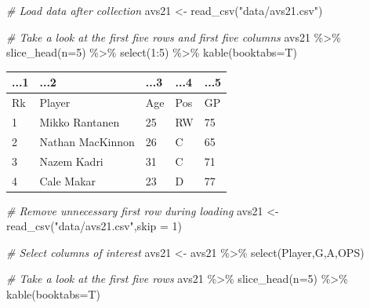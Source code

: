 \documentclass[
  11pt,
]{book}
\newenvironment{Shaded}{\begin{snugshade}}{\end{snugshade}}
\newcommand{\AttributeTok}[1]{\textcolor[rgb]{0.77,0.63,0.00}{#1}}
\newcommand{\CommentTok}[1]{\textcolor[rgb]{0.56,0.35,0.01}{\textit{#1}}}
\newcommand{\DecValTok}[1]{\textcolor[rgb]{0.00,0.00,0.81}{#1}}
\newcommand{\FunctionTok}[1]{\textcolor[rgb]{0.00,0.00,0.00}{#1}}
\newcommand{\NormalTok}[1]{#1}
\newcommand{\OtherTok}[1]{\textcolor[rgb]{0.56,0.35,0.01}{#1}}
\newcommand{\SpecialCharTok}[1]{\textcolor[rgb]{0.00,0.00,0.00}{#1}}
\newcommand{\StringTok}[1]{\textcolor[rgb]{0.31,0.60,0.02}{#1}}
\theoremstyle{definition}
\theoremstyle{definition}
\theoremstyle{definition}
\theoremstyle{definition}
\theoremstyle{remark}
\begin{document}
\begin{Shaded}
\begin{Highlighting}[]
\CommentTok{\# Load data after collection}
\NormalTok{avs21 }\OtherTok{\textless{}{-}} \FunctionTok{read\_csv}\NormalTok{(}\StringTok{"data/avs21.csv"}\NormalTok{)}

\CommentTok{\# Take a look at the first five rows and first five columns}
\NormalTok{avs21 }\SpecialCharTok{\%\textgreater{}\%} \FunctionTok{slice\_head}\NormalTok{(}\AttributeTok{n=}\DecValTok{5}\NormalTok{) }\SpecialCharTok{\%\textgreater{}\%} \FunctionTok{select}\NormalTok{(}\DecValTok{1}\SpecialCharTok{:}\DecValTok{5}\NormalTok{) }\SpecialCharTok{\%\textgreater{}\%} \FunctionTok{kable}\NormalTok{(}\AttributeTok{booktabs=}\NormalTok{T)}
\end{Highlighting}
\end{Shaded}

\begin{tabular}{lllll}
\toprule
...1 & ...2 & ...3 & ...4 & ...5\\
\midrule
Rk & Player & Age & Pos & GP\\
1 & Mikko Rantanen & 25 & RW & 75\\
2 & Nathan MacKinnon & 26 & C & 65\\
3 & Nazem Kadri & 31 & C & 71\\
4 & Cale Makar & 23 & D & 77\\
\bottomrule
\end{tabular}

\begin{Shaded}
\begin{Highlighting}[]
\CommentTok{\# Remove unnecessary first row during loading}
\NormalTok{avs21 }\OtherTok{\textless{}{-}} \FunctionTok{read\_csv}\NormalTok{(}\StringTok{"data/avs21.csv"}\NormalTok{,}\AttributeTok{skip =} \DecValTok{1}\NormalTok{)}

\CommentTok{\# Select columns of interest}
\NormalTok{avs21 }\OtherTok{\textless{}{-}}\NormalTok{ avs21 }\SpecialCharTok{\%\textgreater{}\%} \FunctionTok{select}\NormalTok{(Player,G,A,OPS)}

\CommentTok{\# Take a look at the first five rows}
\NormalTok{avs21 }\SpecialCharTok{\%\textgreater{}\%} \FunctionTok{slice\_head}\NormalTok{(}\AttributeTok{n=}\DecValTok{5}\NormalTok{) }\SpecialCharTok{\%\textgreater{}\%} \FunctionTok{kable}\NormalTok{(}\AttributeTok{booktabs=}\NormalTok{T)}
\end{Highlighting}
\end{Shaded}
\end{document}
